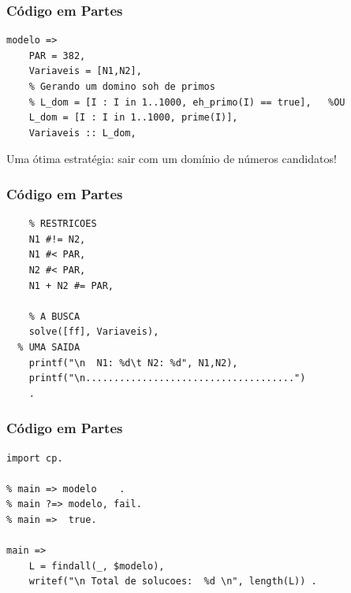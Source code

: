 \begin{frame}[fragile] 

\frametitle{Código em Partes}

\begin{small}
\begin{verbatim}
modelo => 
    PAR = 382,
    Variaveis = [N1,N2],
    % Gerando um domino soh de primos
    % L_dom = [I : I in 1..1000, eh_primo(I) == true],   %OU
    L_dom = [I : I in 1..1000, prime(I)],
    Variaveis :: L_dom,
\end{verbatim}
\end{small}
   
   Uma ótima estratégia: sair com um domínio de números candidatos!
    
\end{frame}
\begin{frame}[fragile] 

\frametitle{Código em Partes}

\begin{small}
\begin{verbatim}
    % RESTRICOES
    N1 #!= N2,
    N1 #< PAR,  
    N2 #< PAR,
    N1 + N2 #= PAR,
  
	% A BUSCA
	solve([ff], Variaveis),
  % UMA SAIDA
	printf("\n  N1: %d\t N2: %d", N1,N2),
	printf("\n.....................................")
	.
\end{verbatim}
\end{small}
    
\end{frame}
\begin{frame}[fragile] 

\frametitle{Código em Partes}

\begin{small}
\begin{verbatim}
import cp.

% main => modelo	.
% main ?=> modelo, fail.	
% main =>  true.	

main =>
    L = findall(_, $modelo),
    writef("\n Total de solucoes:  %d \n", length(L)) .

\end{verbatim}
\end{small}
    
\end{frame}



